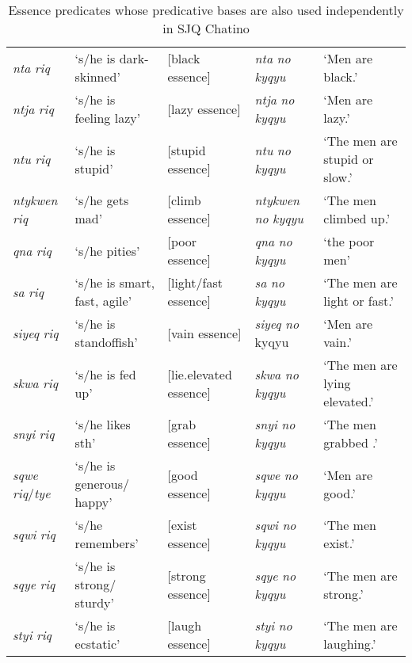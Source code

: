 \documentclass[output=paper]{langsci/langscibook}
\begin{document}
\begin{table}
\begin{tabularx}{\textwidth}{lQQlQ}
\emph{nta} \emph{riq} &`s/he is dark-skinned'&[black essence]&\emph{nta} \emph{no} \emph{kyqyu} &`Men are black.' \\
\emph{ntja} \emph{riq} &`s/he is feeling lazy'&[lazy essence]&\emph{ntja} \emph{no} \emph{kyqyu} &`Men are lazy.' \\
\emph{ntu} \emph{riq} &`s/he is stupid'&[stupid essence]&\emph{ntu} \emph{no} \emph{kyqyu}  &`The men are stupid or slow.' \\
\emph{ntykwen} \emph{riq} &`s/he gets mad'&[climb essence]&\emph{ntykwen} \emph{no} \emph{kyqyu} &`The men climbed up.' \\
\emph{qna} \emph{riq} &`s/he pities'&[poor essence]&\emph{qna} \emph{no} \emph{kyqyu} &`the poor men' \\
\emph{sa} \emph{riq} &`s/he is smart, fast, agile'&[light/fast essence]&\emph{sa} \emph{no} \emph{kyqyu} &`The men are light or fast.' \\
\emph{siyeq} \emph{riq}&`s/he is standoffish'&[vain essence]&\emph{siyeq} \emph{no} kyqyu&`Men are vain.' \\
\emph{skwa} \emph{riq} &`s/he is fed up'&[lie.elevated essence]&\emph{skwa} \emph{no} \emph{kyqyu} &`The men are lying elevated.' \\
\emph{snyi} \emph{riq} &`s/he likes sth'&[grab essence]&\emph{snyi} \emph{no} \emph{kyqyu} &`The men grabbed .' \\
\emph{sqwe} \emph{riq}/\emph{tye} &`s/he is generous/ happy'&[good essence]&\emph{sqwe} \emph{no} \emph{kyqyu} &`Men are good.' \\
\emph{sqwi} \emph{riq} &`s/he remembers'&[exist essence]&\emph{sqwi} \emph{no} \emph{kyqyu} &`The men exist.' \\
\emph{sqye} \emph{riq} &`s/he is strong/ sturdy'&[strong essence]&\emph{sqye} \emph{no} \emph{kyqyu} &`The men are strong.' \\
\emph{styi} \emph{riq} &`s/he is ecstatic'&[laugh essence]&\emph{styi} \emph{no} \emph{kyqyu} &`The men are laughing.' \\
\midrule
\end{tabularx}
\caption{Essence predicates whose predicative bases are also used independently in SJQ Chatino}
\label{tab:CruzStump:sjq-18}
\end{table}
\end{document}
